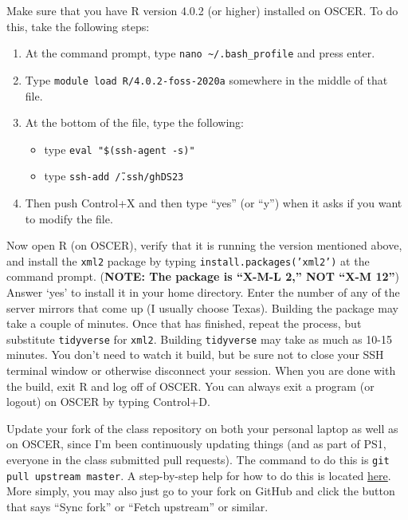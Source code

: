 \documentclass[12pt,english]{exam}
\begin{document}
\begin{questions}
\question Make sure that you have R version 4.0.2 (or higher) installed on OSCER. To do this, take the following steps:
\begin{enumerate}
    \item At the command prompt, type \texttt{nano \textasciitilde/.bash\_profile} and press enter. 
    \item Type \texttt{module load R/4.0.2-foss-2020a} somewhere in the middle of that file. 
    \item At the bottom of the file, type the following:
        \begin{itemize}
        \item type \texttt{eval "\$(ssh-agent -s)"}
        \item type \texttt{ssh-add \~/.ssh/ghDS23}
        \end{itemize}
    \item Then push Control+X and then type ``yes'' (or ``y'') when it asks if you want to modify the file.
\end{enumerate}

\question Now open R (on OSCER), verify that it is running the version mentioned above, and install the \texttt{xml2} package by typing \texttt{install.packages('xml2')} at the command prompt. (\textbf{NOTE: The package is ``X-M-L 2,'' NOT ``X-M 12''}) Answer `yes' to install it in your home directory. Enter the number of any of the server mirrors that come up (I usually choose Texas). Building the package may take a couple of minutes. Once that has finished, repeat the process, but substitute \texttt{tidyverse} for \texttt{xml2}. Building \texttt{tidyverse} may take as much as 10-15 minutes. You don't need to watch it build, but be sure not to close your SSH terminal window or otherwise disconnect your session. When you are done with the build, exit R and log off of OSCER. You can always exit a program (or logout) on OSCER by typing Control+D.

\question Update your fork of the class repository on both your personal laptop as well as on OSCER, since I'm been continuously updating things (and as part of PS1, everyone in the class submitted pull requests). The command to do this is \texttt{git pull upstream master}. A step-by-step help for how to do this is located \href{https://help.github.com/articles/syncing-a-fork/}{here}. More simply, you may also just go to your fork on GitHub and click the button that says ``Sync fork'' or ``Fetch upstream'' or similar.

\end{questions}
\end{document}
